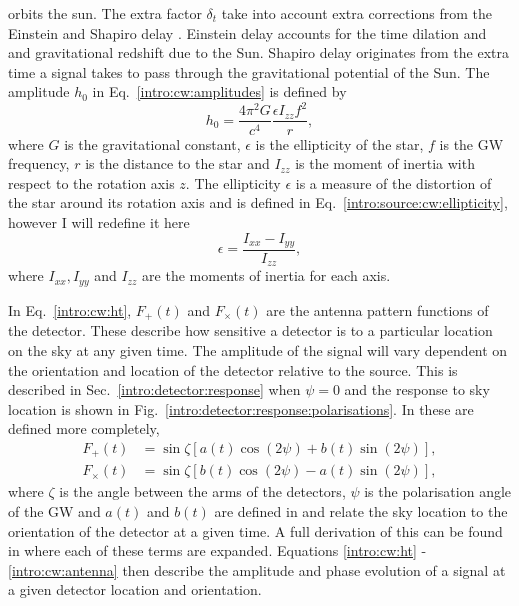 orbits the sun. The extra factor $\delta_t$ take into account
extra corrections from the Einstein and Shapiro delay
\citep{taylor1992PulsarTiming}. Einstein delay accounts for the time dilation and and gravitational redshift due to the Sun. Shapiro delay originates from the extra time a signal takes to pass through the gravitational potential of the Sun. The amplitude
$h_0$ in Eq.~\ref{intro:cw:amplitudes} is defined by
%
\begin{equation}
    h_0 = \frac{4 \pi^2 G}{c^4} \frac{\epsilon I_{zz} f^2}{r},
\end{equation}
%
where $G$ is the gravitational constant, $\epsilon$ is the ellipticity of the star, $f$
is the \gls{GW} frequency, $r$ is the distance to the star and $I_{zz}$ is the
moment of inertia with respect to the rotation axis $z$.  The ellipticity $\epsilon$ is a measure of the distortion of the star around its rotation axis and is defined in Eq.~\ref{intro:source:cw:ellipticity}, however I will redefine it here
%
\begin{equation}
    \epsilon = \frac{I_{xx} - I_{yy}}{I_{zz}},
\end{equation}
%
where $I_{xx}, I_{yy}$ and $I_{zz}$ are the moments of inertia for each axis.

In Eq.~\ref{intro:cw:ht}, $F_+(t)$ and $F_{\times}(t)$ are the antenna pattern
functions of the detector.  These describe how sensitive a detector is to a
particular location on the sky at any given time.  The amplitude of the signal
will vary dependent on the orientation and location of the detector relative to
the source.  This is described in Sec.~\ref{intro:detector:response} when $\psi=0$ and the response to
sky location is shown in Fig.~\ref{intro:detector:response:polarisations}.  In \citep{schutz1998DataAnalysis} these are defined more completely, 
%
\begin{equation}
\label{intro:cw:antenna}
\begin{split}
F_{+}(t) &= \sin{\zeta}[a(t)\cos{(2\psi)} + b(t)\sin{(2\psi)}], \\
F_{\times}(t) &= \sin{\zeta}[b(t) \cos{(2\psi)} - a(t)\sin{(2\psi)}],
\end{split}
\end{equation}
%
where $\zeta$ is the angle between the arms of the detectors, $\psi$ is the
polarisation angle of the \gls{GW} and $a(t)$ and $b(t)$ are defined in
\citep{schutz1998DataAnalysis} and relate the sky location to the orientation
of the detector at a given time.  A full derivation of this can be found in
\citep{schutz1998DataAnalysis} where each of these terms are expanded.
Equations \ref{intro:cw:ht} - \ref{intro:cw:antenna} then describe the amplitude and phase evolution of a
signal at a given detector location and orientation.



